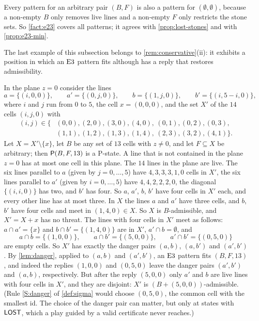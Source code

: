 Every pattern for an arbitrary pair $(B,F)$ is also a pattern for $(\emptyset,\emptyset)$, because a
non-empty $B$ only removes live lines and a non-empty $F$ only restricts the stone sets. So \cref{fact:e23} covers all patterns; it agrees with \cref{prop:lost-stones} and with
\cref{prop:e23-min}.

\smallskip
The last example of this subsection belongs to \cref{rem:conservative}(ii): it exhibits a position in
which an $\mathrm{E3}$ pattern fits although \Breaker{} has a reply that restores admissibility.

\begin{example}\label{ex:conservative}
In the plane $z=0$ consider the lines
\[ a=\{(i,0,0)\},\qquad a'=\{(0,j,0)\},\qquad b=\{(1,j,0)\},\qquad b'=\{(i,5-i,0)\}, \]
where $i$ and $j$ run from $0$ to $5$, the cell $x=(0,0,0)$, and the set $X'$ of the $14$ cells $(i,j,0)$
with
\begin{align*}
(i,j)\in\{&(0,0),(2,0),(3,0),(4,0),\ (0,1),(0,2),(0,3),\\
          &(1,1),(1,2),(1,3),(1,4),\ (2,3),(3,2),(4,1)\}.
\end{align*}
Let $X=X'\setminus\{x\}$, let $B$ be any set of $13$ cells with $z\ne 0$, and let $F\subseteq X$ be arbitrary;
then $\mathsf{P}(B,F,13)$ is a P-state. A line that is not contained in the plane $z=0$ has at most one cell in
this plane. The $14$ lines in the plane are live. The six lines parallel to $a$ (given by $j=0,\dots,5$) have
$4,3,3,3,1,0$ cells in $X'$, the six lines parallel to $a'$ (given by $i=0,\dots,5$) have $4,4,2,2,2,0$, the
diagonal $\{(i,i,0)\}$ has two, and $b'$ has four. So $a$, $a'$, $b$, $b'$ have four cells in $X'$ each, and
every other line has at most three. In $X$ the lines $a$ and $a'$ have three cells, and $b$, $b'$ have four
cells and meet in $(1,4,0)\in X$. So $X$ is $B$-admissible, and $X'=X+x$ has no threat. The lines with four
cells in $X'$ meet as follows: $a\cap a'=\{x\}$ and $b\cap b'=\{(1,4,0)\}$ are in $X'$,
$a'\cap b=\emptyset$, and
\[ a\cap b=\{(1,0,0)\},\qquad a\cap b'=\{(5,0,0)\},\qquad a'\cap b'=\{(0,5,0)\} \]
are empty cells. So $X'$ has exactly the danger pairs $(a,b)$, $(a,b')$ and $(a',b')$. By
\cref{lem:danger}, applied to $(a,b)$ and $(a',b')$, an $\mathrm{E3}$ pattern fits $(B,F,13)$, and indeed the
replies $(1,0,0)$ and $(0,5,0)$ leave the danger pairs $(a',b')$ and $(a,b)$, respectively. But after the
reply $(5,0,0)$ only $a'$ and $b$ are live lines with four cells in $X'$, and they are disjoint: $X'$ is
$(B+(5,0,0))$-admissible. (Rule \ref{S:danger} of \cref{def:sigma} would choose $(0,5,0)$, the common
cell with the smallest id. The choice of the danger pair can matter, but only at states with $\mathsf{LOST}$, which a
play guided by a valid certificate never reaches.)
\end{example}
